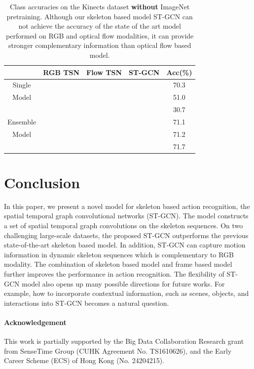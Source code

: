 \documentclass[letterpaper]{article} %
\begin{document}
\begin{table}
	\small
	\centering
	\begin{tabular}{c|ccc|c}
		  &RGB TSN   &   Flow TSN &   ST-GCN   &Acc(\%) \\
		\hline
		\hline
		 Single&\checkmark &            &            & 70.3\\
		 Model&           & \checkmark &            & 51.0\\
		 &           &            & \checkmark & 30.7\\ \hline
		 Ensemble&\checkmark &\checkmark  &            & 71.1\\
		 Model&\checkmark &            & \checkmark & 71.2\\
		 &\checkmark &\checkmark  & \checkmark & 71.7\\

	\end{tabular}
	\caption{Class accuracies on the Kinects dataset \textbf{without} ImageNet pretraining. Although our skeleton based model ST-GCN can not achieve the accuracy of the state of the art model performed on RGB and optical flow modalities, it can provide stronger complementary information than optical flow based model.}\label{tab:kinetics_ensemble}
\end{table}


\section{Conclusion}
In this paper, we present a novel model for skeleton based action recognition, the spatial temporal graph convolutional networks (ST-GCN).
The model constructs a set of spatial temporal graph convolutions on the skeleton sequences.
On two challenging large-scale datasets, the proposed ST-GCN outperforms the previous state-of-the-art skeleton based model.
In addition, ST-GCN can capture motion information in dynamic skeleton sequences which is complementary to RGB modality. The combination of skeleton based model and frame based model further improves the performance in action recognition.
The flexibility of ST-GCN model also opens up many possible directions for future works.
For example, how to incorporate contextual information, such as scenes, objects, and interactions into ST-GCN becomes a natural question.

\paragraph{Acknowledgement} This work is partially supported by the Big Data Collaboration Research grant from SenseTime Group (CUHK Agreement No. TS1610626), and the Early Career Scheme (ECS) of Hong Kong (No. 24204215).
\end{document}
